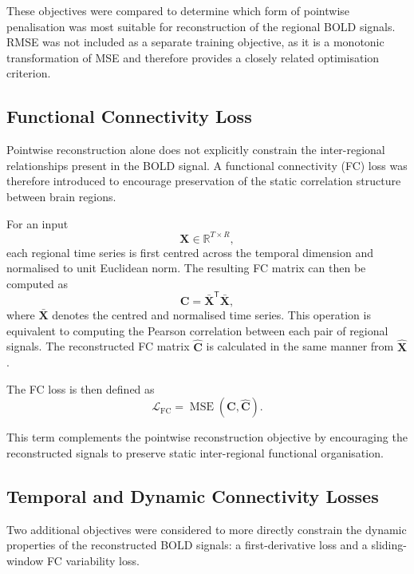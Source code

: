 These objectives were compared to determine which form of pointwise
penalisation was most suitable for reconstruction of the regional BOLD
signals. RMSE was not included as a separate training objective, as it is
a monotonic transformation of MSE and therefore provides a closely related
optimisation criterion.

\subsection{Functional Connectivity Loss}

Pointwise reconstruction alone does not explicitly constrain the
inter-regional relationships present in the BOLD signal. A functional
connectivity (FC) loss was therefore introduced to encourage preservation
of the static correlation structure between brain regions.

For an input
\[
\mathbf{X}\in\mathbb{R}^{T\times R},
\]
each regional time series is first centred across the temporal dimension
and normalised to unit Euclidean norm. The resulting FC matrix can then be
computed as
\begin{equation}
    \mathbf{C}
    =
    \bar{\mathbf{X}}^{\mathsf{T}}
    \bar{\mathbf{X}},
\end{equation}
where $\bar{\mathbf{X}}$ denotes the centred and normalised time series.
This operation is equivalent to computing the Pearson correlation between
each pair of regional signals. The reconstructed FC matrix
$\hat{\mathbf{C}}$ is calculated in the same manner from
$\hat{\mathbf{X}}$.

The FC loss is then defined as
\begin{equation}
    \mathcal{L}_{\mathrm{FC}}
    =
    \operatorname{MSE}
    \left(
        \mathbf{C},
        \hat{\mathbf{C}}
    \right).
\end{equation}

This term complements the pointwise reconstruction objective by encouraging
the reconstructed signals to preserve static inter-regional functional
organisation.

\subsection{Temporal and Dynamic Connectivity Losses}

Two additional objectives were considered to more directly constrain the
dynamic properties of the reconstructed BOLD signals: a first-derivative
loss and a sliding-window FC variability loss.

